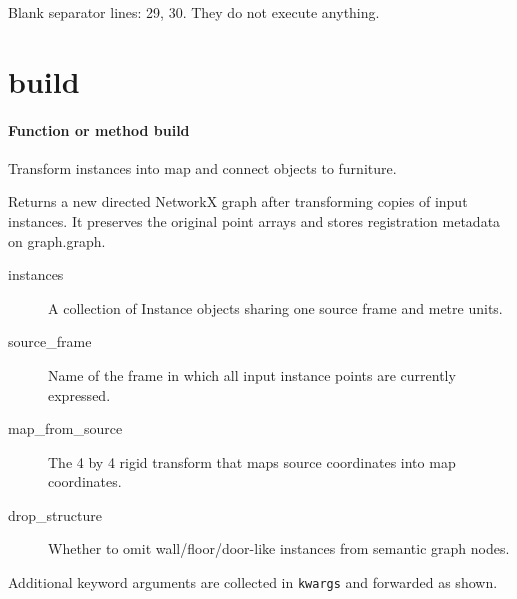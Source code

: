 \documentclass[11pt,a4paper]{book}
\begin{document}
Blank separator lines: 29, 30. They do not execute anything.

\section{build}

\paragraph{Function or method build}
Transform instances into map and connect objects to furniture.

Returns a new directed NetworkX graph after transforming copies of input instances. It preserves the original point arrays and stores registration metadata on graph.graph.

\begin{description}
\item[instances] A collection of Instance objects sharing one source frame and metre units.
\item[source\_frame] Name of the frame in which all input instance points are currently expressed.
\item[map\_from\_source] The 4 by 4 rigid transform that maps source coordinates into map coordinates.
\item[drop\_structure] Whether to omit wall/floor/door-like instances from semantic graph nodes.
\end{description}
Additional keyword arguments are collected in \texttt{kwargs} and forwarded as shown.
\end{document}
